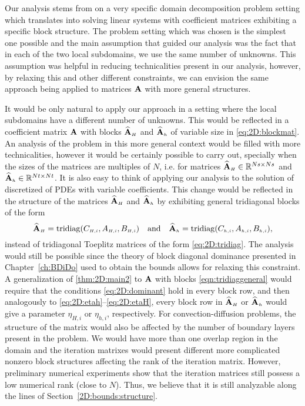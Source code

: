Our analysis stems from on a very specific domain decomposition problem setting
which translates into solving linear systems with coefficient matrices
exhibiting a specific block structure. The problem setting which was chosen is
the simplest one possible and the main assumption that guided our analysis was
the fact that in each of the two local subdomains, we use the same number of
unknowns. This assumption was helpful in reducing technicalities present in our
analysis, however, by relaxing this and other different constraints, we can
envision the same approach being applied to matrices $\mathbf{A}$ with more general
structures.

It would be only natural to apply our approach in a setting where the local
subdomains have a different number of unknowns. This would be reflected in a
coefficient matrix $\mathbf{A}$ with blocks $\widehat{\mathbf{A}}_{\scriptscriptstyle H}$ and $\widehat{\mathbf{A}}_{\scriptscriptstyle h}$ of variable
size in \eqref{eq:2D:blockmat}. An analysis of the problem in this more general
context would be filled with more technicalities, however it would be certainly
possible to carry out, specially when the sizes of the matrices are multiples
of $N$, i.e. for matrices $\widehat{\mathbf{A}}_{\scriptscriptstyle H}\in\mathbb{R}^{Ns\times Ns}$ and
$\widehat{\mathbf{A}}_{\scriptscriptstyle h}\in\mathbb{R}^{Nt\times Nt}$. It is also easy to think of applying our
analysis to the solution of discretized of PDEs with variable coefficients.
This change would be reflected in the structure of the matrices $\widehat{\mathbf{A}}_{\scriptscriptstyle H}$ and
$\widehat{\mathbf{A}}_{\scriptscriptstyle h}$ by exhibiting general tridiagonal blocks of the form
\begin{equation}\label{eqn:tridiaggeneral}
\widehat{\mathbf{A}}_{\scriptscriptstyle H}=\mathrm{tridiag}(C_{\scriptscriptstyle H,i},A_{\scriptscriptstyle H,i},B_{\scriptscriptstyle H,i})
\quad\text{and}\quad
\widehat{\mathbf{A}}_{\scriptscriptstyle h}=\mathrm{tridiag}(C_{\scriptscriptstyle h,i},A_{\scriptscriptstyle h,i},B_{\scriptscriptstyle h,i}),
\end{equation}
instead of tridiagonal Toeplitz matrices of the form \eqref{eq:2D:tridiag}. The
analysis would still be possible since the theory of block diagonal dominance presented in Chapter~\ref{ch:BDiDo} used to obtain the
bounds allows for relaxing this constraint. A generalization of
\ref{thm:2D:main2} to $\mathbf{A}$ with blocks \eqref{eqn:tridiaggeneral} would require
that the conditions \eqref{eq:2D:dominant} hold in every block row, and then
analogously to \eqref{eq:2D:etah}--\eqref{eq:2D:etaH}, every block row in
$\widehat{\mathbf{A}}_{\scriptscriptstyle H}$ or $\widehat{\mathbf{A}}_{\scriptscriptstyle h}$ would give a parameter $\eta_{H,i}$
or $\eta_{h,i}$, respectively. For convection-diffusion problems, the structure of the matrix would also be affected by the number of boundary layers present in the problem. We would have more than one overlap region in the domain and the iteration matrixes would present different more complicated nonzero block structures affecting the rank of the iteration matrix. However, preliminary numerical experiments show that the iteration matrices still possess a low numerical rank (close to $N$). Thus, we believe that it is still analyzable
along the lines of Section~\ref{2D:bounds:structure}.

